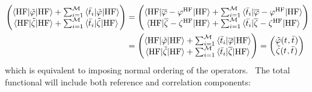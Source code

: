 \begin{equation}
  \begin{aligned}
  \begin{pmatrix}
   \braket{\mathrm{HF} | \tilde{\varphi} | \mathrm{HF}}
  + \sum_{i=1}^{\mathcal{M}}\braket{\bar{t}_{i} | \tilde{\varphi} | \mathrm{HF}} \\
   \braket{\mathrm{HF} | \tilde{\zeta} | \mathrm{HF}}
  + \sum_{i=1}^{\mathcal{M}}\braket{\bar{t}_{i} | \tilde{\zeta} | \mathrm{HF}}
  \end{pmatrix}
  &=
  \begin{pmatrix}
    \braket{\mathrm{HF} | \overline{\varphi} - \varphi^\mathrm{HF} | \mathrm{HF}}
  + \sum_{i=1}^{\mathcal{M}}\braket{\bar{t}_{i} | \overline{\varphi} - \varphi^\mathrm{HF} | \mathrm{HF}} \\
  \braket{\mathrm{HF} | \overline{\zeta} - \zeta^\mathrm{HF} | \mathrm{HF}}
  + \sum_{i=1}^{\mathcal{M}}\braket{\bar{t}_{i} | \overline{\zeta} -
  \zeta^\mathrm{HF}| \mathrm{HF}}
  \end{pmatrix}
  \\
  &=
  \begin{pmatrix}
   \braket{\mathrm{HF} | \tilde{\varphi} | \mathrm{HF}}
  + \sum_{i=1}^{\mathcal{M}}\braket{\bar{t}_{i} | \overline{\varphi} | \mathrm{HF}} \\
   \braket{\mathrm{HF} | \tilde{\zeta} | \mathrm{HF}}
  + \sum_{i=1}^{\mathcal{M}}\braket{\bar{t}_{i} | \overline{\zeta} | \mathrm{HF}}
  \end{pmatrix}
  =
  \begin{pmatrix}
    \tilde{\varphi}(t_{}, \bar{t}_{}) \\
    \tilde{\zeta}(t_{}, \bar{t}_{})
  \end{pmatrix}
\end{aligned}
\end{equation}
which is equivalent to imposing normal ordering of the
operators.~\cite{Shavitt}
The total functional will include both reference and correlation
components:
